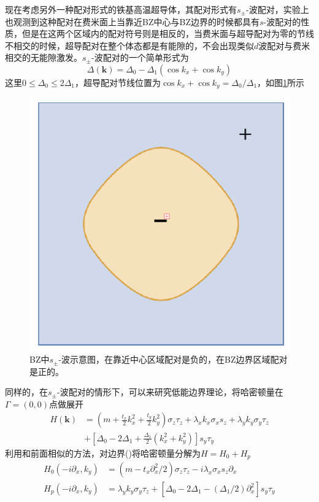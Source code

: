  现在考虑另外一种配对形式的铁基高温超导体，其配对形式有$s_\pm$-波配对，实验上也观测到这种配对在费米面上当靠近BZ中心与BZ边界的时候都具有$s$-波配对的性质，但是在这两个区域内的配对符号则是相反的，当费米面与超导配对为零的节线不相交的时候，超导配对在整个体态都是有能隙的，不会出现类似$d$波配对与费米相交的无能隙激发。$s_\pm$-波配对的一个简单形式为
\begin{equation}
\Delta(\mathbf{k})=\Delta_0-\Delta_1(\cos k_x+\cos k_y)
\end{equation}
这里$0\le\Delta_0\le2\Delta_1$，超导配对节线位置为$\cos k_x+\cos k_y=\Delta_0/\Delta_1$，如图\ref{fig10}所示
\begin{figure}[h]
\centering
\includegraphics[scale=0.5]{pic/fig11.png}
\caption{BZ中$s_\pm$-波示意图，在靠近中心区域配对是负的，在BZ边界区域配对是正的。}\label{fig10}
\end{figure}
同样的，在$s_\pm$-波配对的情形下，可以来研究低能边界理论，将哈密顿量在$\Gamma=(0,0)$点做展开
\begin{equation}
\begin{aligned}
H(\mathbf{k})&=(m+\frac{t_x}{2}k_x^2+\frac{t_y}{2}k_y^2)\sigma_z\tau_z+\lambda_xk_x\sigma_xs_z+\lambda_yk_y\sigma_y\tau_z\\
&+\left[\Delta_0-2\Delta_1+\frac{\Delta_1}{2}(k_x^2+k_y^2)\right]s_y\tau_y\label{hoti2s}
\end{aligned}
\end{equation}
利用和前面相似的方法，对边界(\uppercase\expandafter{})将哈密顿量分解为$H=H_0+H_p$
\begin{equation}
\begin{aligned}
H_0(-i\partial_x,k_y)&=(m-t_x\partial_x^2/2)\sigma_z\tau_z-i\lambda_x\sigma_xs_z\partial_x\\
H_p(-i\partial_x,k_y)&=\lambda_yk_y\sigma_y\tau_z+\left[\Delta_0-2\Delta_1-(\Delta_1/2)\partial_x^2\right]s_y\tau_y
\end{aligned}
\end{equation}
